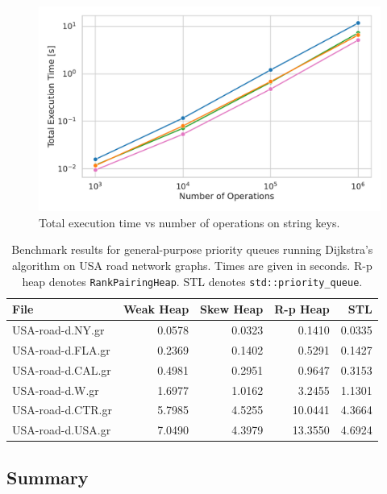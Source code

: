 \begin{figure}[H]
    \centering
    \includegraphics[width=1.0\textwidth]{figures/plots/plot_string_performance.pdf}
    \caption{Total execution time vs number of operations on string keys.}
\end{figure}

\begin{table}[ht]
\centering
\begin{tabular}{|l|r|r|r|r|}
\hline
\textbf{File} & \textbf{Weak Heap} & \textbf{Skew Heap} & \textbf{R-p Heap} & \textbf{STL} \\
\hline
USA-road-d.NY.gr   & 0.0578 & 0.0323 & 0.1410 & 0.0335 \\
USA-road-d.FLA.gr  & 0.2369 & 0.1402 & 0.5291 & 0.1427 \\
USA-road-d.CAL.gr  & 0.4981 & 0.2951 & 0.9647 & 0.3153 \\
USA-road-d.W.gr    & 1.6977 & 1.0162 & 3.2455 & 1.1301 \\
USA-road-d.CTR.gr  & 5.7985 & 4.5255 & 10.0441 & 4.3664 \\
USA-road-d.USA.gr  & 7.0490 & 4.3979 & 13.3550 & 4.6924 \\
\hline
\end{tabular}
\caption{Benchmark results for general-purpose priority queues running Dijkstra's algorithm on USA road network graphs. Times are given in seconds. R-p heap denotes \texttt{RankPairingHeap}. STL denotes \texttt{std::priority\_queue}.}
\label{tab:dijkstra_results}
\end{table}

\subsection{Summary}

